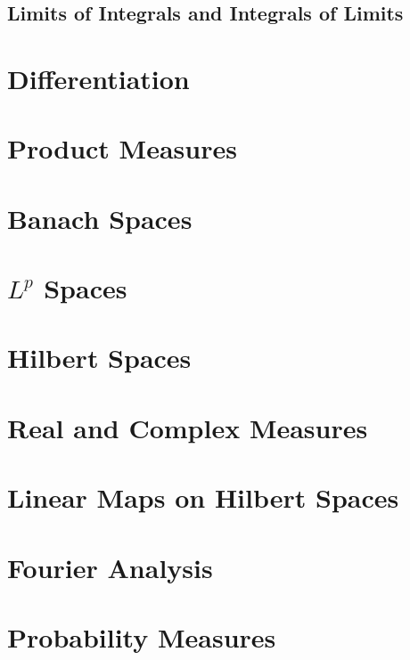\documentclass[11pt,oneside]{book}
\begin{document}
\section{Limits of Integrals and Integrals of Limits}









\chapter{Differentiation}






\chapter{Product Measures}








\chapter{Banach Spaces}







\chapter{\texorpdfstring{$L^p$}{Lp} Spaces}





\chapter{Hilbert Spaces}





\chapter{Real and Complex Measures}





\chapter{Linear Maps on Hilbert Spaces}






\chapter{Fourier Analysis}





\chapter{Probability Measures}
\end{document}
